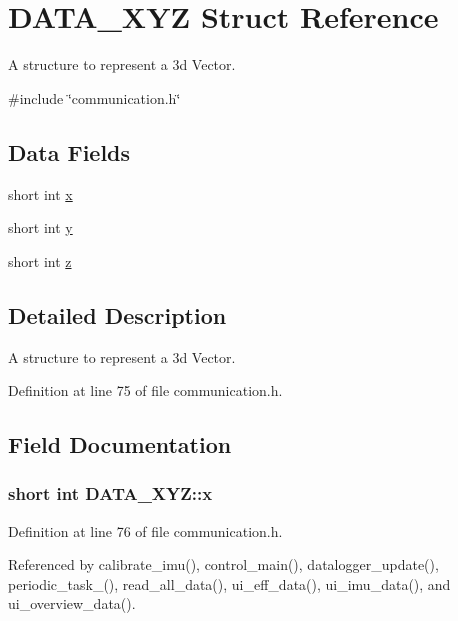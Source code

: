 \hypertarget{structDATA__XYZ}{\section{D\-A\-T\-A\-\_\-\-X\-Y\-Z Struct Reference}
\label{structDATA__XYZ}
}


A structure to represent a 3d Vector.  




{\ttfamily \#include \char`\"{}communication.\-h\char`\"{}}

\subsection*{Data Fields}
\begin{DoxyCompactItemize}
\item 
short int \hyperlink{structDATA__XYZ_a54c1596e9f9969fd9c21e8458024ecfb}{x}
\item 
short int \hyperlink{structDATA__XYZ_a94bbb1c889bf53eb6a5fffa2b39322cf}{y}
\item 
short int \hyperlink{structDATA__XYZ_a69e89ab0ec6e5d72fc5d54f62cc07fb5}{z}
\end{DoxyCompactItemize}


\subsection{Detailed Description}
A structure to represent a 3d Vector. 

Definition at line 75 of file communication.\-h.



\subsection{Field Documentation}
\hypertarget{structDATA__XYZ_a54c1596e9f9969fd9c21e8458024ecfb}{
\subsubsection[{x}]{\setlength{\rightskip}{0pt plus 5cm}short int D\-A\-T\-A\-\_\-\-X\-Y\-Z\-::x}}\label{structDATA__XYZ_a54c1596e9f9969fd9c21e8458024ecfb}


Definition at line 76 of file communication.\-h.



Referenced by calibrate\-\_\-imu(), control\-\_\-main(), datalogger\-\_\-update(), periodic\-\_\-task\-\_(), read\-\_\-all\-\_\-data(), ui\-\_\-eff\-\_\-data(), ui\-\_\-imu\-\_\-data(), and ui\-\_\-overview\-\_\-data().

